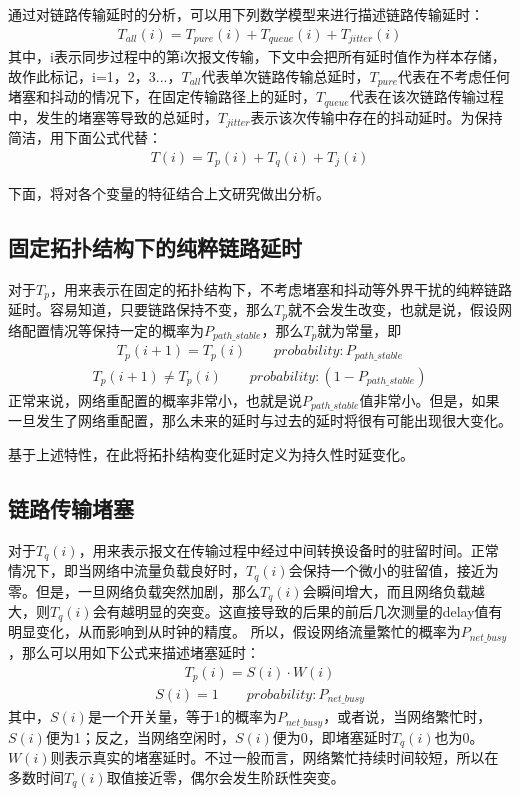 通过对链路传输延时的分析，可以用下列数学模型来进行描述链路传输延时：
\begin {align}
T_{all}(i) = T_{pure}(i) + T_{queue}(i) + T_{jitter}(i)
\end{align}
其中，i表示同步过程中的第i次报文传输，下文中会把所有延时值作为样本存储，故作此标记，i=1，2，3...，$T_{all}$代表单次链路传输总延时，$T_{pure}$代表在不考虑任何堵塞和抖动的情况下，在固定传输路径上的延时，$T_{queue}$代表在该次链路传输过程中，发生的堵塞等导致的总延时，$T_{jitter}$表示该次传输中存在的抖动延时。为保持简洁，用下面公式代替：
\begin {align}
T(i) = T_{p}(i) + T_{q}(i) + T_{j}(i)
\end{align}

下面，将对各个变量的特征结合上文研究做出分析。
\subsection{固定拓扑结构下的纯粹链路延时}
对于$T_{p}$，用来表示在固定的拓扑结构下，不考虑堵塞和抖动等外界干扰的纯粹链路延时。容易知道，只要链路保持不变，那么$T_{p}$就不会发生改变，也就是说，假设网络配置情况等保持一定的概率为$P_{path\_stable}$，那么$T_{p}$就为常量，即
\begin {align}
T_{p}(i+1) = T_{p}(i) \qquad probability: P_{path\_stable}
\end{align}
\begin {align}
T_{p}(i+1) \neq T_{p}(i) \qquad probability: (1-P_{path\_stable})
\end{align}
正常来说，网络重配置的概率非常小，也就是说$P_{path\_stable}$值非常小。但是，如果一旦发生了网络重配置，那么未来的延时与过去的延时将很有可能出现很大变化。

基于上述特性，在此将拓扑结构变化延时定义为持久性时延变化。

\subsection{链路传输堵塞}
对于$T_{q}(i)$，用来表示报文在传输过程中经过中间转换设备时的驻留时间。正常情况下，即当网络中流量负载良好时，$T_{q}(i)$会保持一个微小的驻留值，接近为零。但是，一旦网络负载突然加剧，那么$T_{q}(i)$会瞬间增大，而且网络负载越大，则$T_{q}(i)$会有越明显的突变。这直接导致的后果的前后几次测量的delay值有明显变化，从而影响到从时钟的精度。
所以，假设网络流量繁忙的概率为$P_{net\_busy}$，那么可以用如下公式来描述堵塞延时：
\begin {align}
T_{p}(i) = S(i) \cdot W(i) 
\end{align}
\begin {align}
S(i) = 1 \qquad probability: P_{net\_busy}
\end{align}
其中，$S(i)$是一个开关量，等于1的概率为$P_{net\_busy}$，或者说，当网络繁忙时，$S(i)$便为1；反之，当网络空闲时，$S(i)$便为0，即堵塞延时$T_{q}(i)$也为0。$W(i)$则表示真实的堵塞延时。不过一般而言，网络繁忙持续时间较短，所以在多数时间$T_{q}(i)$取值接近零，偶尔会发生阶跃性突变。

